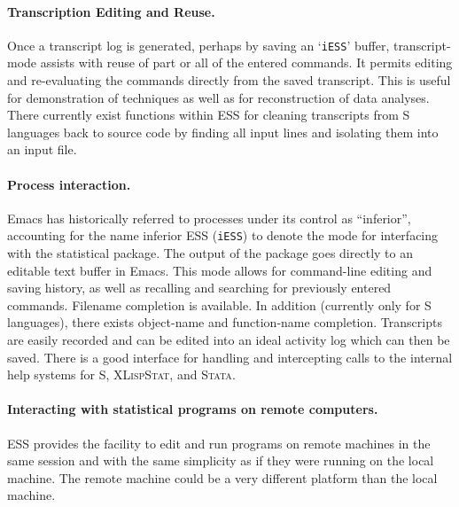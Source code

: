 \documentclass{article}
\newcommand*{\XLispStat}{\textsc{XLispStat}}
\newcommand*{\Stata}{\textsc{Stata}}
\newcommand{\stexttt}[1]{{\small\texttt{#1}}}
\newcommand{\file}[1]{`\stexttt{#1}'}
\begin{document}
\paragraph{Transcription Editing and Reuse.}
Once a transcript log is generated, perhaps by saving an \file{iESS}
buffer, transcript-mode assists with reuse of part or all of the
entered commands.  It permits editing and re-evaluating the commands
directly from the saved transcript.  This is useful for
demonstration of techniques as well as for reconstruction of data
analyses.  There currently exist functions within ESS for cleaning
transcripts from S languages back to source code by finding all input
lines and isolating them into an input file.

\paragraph{Process interaction.}
Emacs has historically referred to processes under its control as
``inferior'', accounting for the name inferior ESS (\stexttt{iESS}) to
denote the mode for interfacing with the statistical package.  The
output of the package goes directly to an editable text buffer in Emacs.
This mode allows for command-line editing and saving history, as well as
recalling and searching for previously entered commands.  Filename
completion is available.  In addition (currently only for S languages),
there exists object-name and function-name completion.  Transcripts are
easily recorded and can be edited into an ideal activity log which can
then be saved.  There is a good interface for handling and intercepting
calls to the internal help systems for S, \XLispStat, and \Stata.

\paragraph{Interacting with statistical programs on remote computers.}
ESS provides the facility to edit and run programs on remote machines
in the same session and with the same simplicity as if they were
running on the local machine.  The remote machine could be a very
different platform than the local machine.
\end{document}

